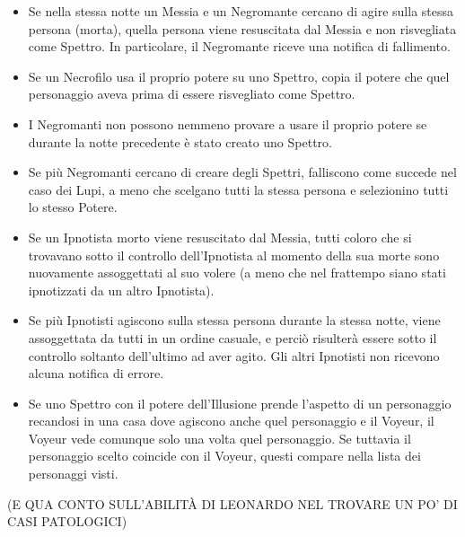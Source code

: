 \documentclass[a4paper,10pt]{article}
\begin{document}
\begin{itemize}
 \item Se nella stessa notte un Messia e un Negromante cercano di agire sulla stessa persona (morta), quella persona viene resuscitata dal Messia e non risvegliata come Spettro. In particolare, il Negromante riceve una notifica di fallimento.
 
 
 \item Se un Necrofilo usa il proprio potere su uno Spettro, copia il potere che quel personaggio aveva prima di essere risvegliato come Spettro.
 
 \item I Negromanti non possono nemmeno provare a usare il proprio potere se durante la notte precedente è stato creato uno Spettro.
 
 \item Se più Negromanti cercano di creare degli Spettri, falliscono come succede nel caso dei Lupi, a meno che scelgano tutti la stessa persona e selezionino tutti lo stesso Potere.

 \item Se un Ipnotista morto viene resuscitato dal Messia, tutti coloro che si trovavano sotto il controllo dell'Ipnotista al momento della sua morte sono nuovamente assoggettati al suo volere (a meno che nel frattempo siano stati ipnotizzati da un altro Ipnotista).
 
 \item Se più Ipnotisti agiscono sulla stessa persona durante la stessa notte, viene assoggettata da tutti in un ordine casuale, e perciò risulterà essere sotto il controllo soltanto dell'ultimo ad aver agito. Gli altri Ipnotisti non ricevono alcuna notifica di errore.
 
 \item Se uno Spettro con il potere dell'Illusione prende l'aspetto di un personaggio recandosi in una casa dove agiscono anche quel personaggio e il Voyeur, il Voyeur vede comunque solo una volta quel personaggio. Se tuttavia il personaggio scelto coincide con il Voyeur, questi compare nella lista dei personaggi visti.

\end{itemize}


(E QUA CONTO SULL'ABILITÀ DI LEONARDO NEL TROVARE UN PO' DI CASI PATOLOGICI)
\end{document}
